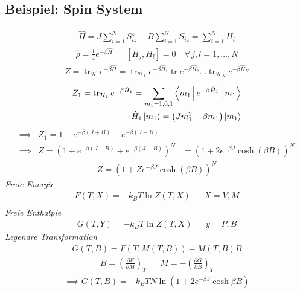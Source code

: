 \documentclass[11pt]{article}
\theoremstyle{plain}
\newcommand{\pd}[2]{\frac{\partial #1 }{\partial #2}}
\newcommand{\trace}{\operatorname{tr}}
\begin{document}
\subsection*{Beispiel: Spin System}
%
\begin{align*}
  \hat{H} = J \sum_{i=1}^{N} S_{iz}^z - B \sum_{i=1}^{N} S_{iz} 
  = \sum_{i=1}^{N} H_i
\end{align*}
%
%
\begin{align*}
  \hat{\rho} = \frac{1}{z} e^{-\beta \hat{H}}  &&
  \left[ H_j, H_l \right] = 0 \quad\forall\, j,l = 1,\dotsc,N
\end{align*}
%
%
\begin{align*}
  Z = \trace_\mathcal{H} e^{-\beta \hat{H}} = \trace_{\mathcal{H}_1} e ^{-\beta \hat{H}_1} \trace
  e^{-\beta \hat{H}_2} \ldots \trace_{\mathcal{H}_N} e^{-\beta \hat{H}_N}
\end{align*}
%
%
\begin{align*}
  Z_1 = \trace_{\mathcal{H}_1} e^{-\beta \hat{H}_1} = \sum_{m_1=1,0,1}^{}
  \Braket{m_1 | e^{-\beta \hat{H}_1} | m_1} \\ \hat{H}_1 \Ket{m_1} = 
  \left( J m_1^2 - \beta m_1 \right) \Ket{m_1}
\end{align*}
%
%
\begin{align*}
  \implies & Z_1 = 1 + e^{-\beta (J+B)} + e^{-\beta (J-B)} \\
  \implies & Z = \left( 1 + e^{-\beta (J+B)} + e^{-\beta(J-B)} \right)^N
  & = \left( 1+2 e^{-\beta J} \cosh(\beta B) \right)^N
\end{align*}
%
%
\begin{align*}
  Z = \left( 1 + Z e ^{-\beta J} \cosh(\beta B) \right)^N 
\end{align*}
\emph{Freie Energie}
%
\begin{align*}
  F(T, X) = - k_B T \ln{Z (T, X)} && X = V, M \\
\end{align*}
\emph{Freie Enthalpie} 
%
\begin{align*}
  G (T, Y) = -k_B T \ln{Z(T, X)} && y = P, B
\end{align*}
\emph{Legendre Transformation}
%
\begin{align*}
  G(T, B) = F (T, M(T, B)) - M(T,B) B
\end{align*}
%
\begin{align*}
  B = \left( \pd{F}{M} \right)_T && M = - \left( \pd{G}{B} \right)_T
\end{align*}
%
%
\begin{align*}
  \implies G(T,B) = -k_B T N \ln{\left( 1+ 2 e^{- \beta J} \cosh{\beta B} \right)}
\end{align*}
%
\end{document}
